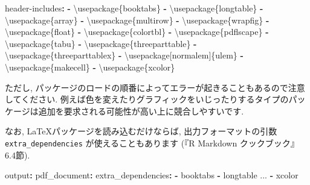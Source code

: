 \documentclass[
]{ltjsarticle}
\newenvironment{Shaded}{\begin{snugshade}}{\end{snugshade}}
\newcommand{\AttributeTok}[1]{\textcolor[rgb]{0.77,0.63,0.00}{#1}}
\newcommand{\FunctionTok}[1]{\textcolor[rgb]{0.00,0.00,0.00}{#1}}
\newcommand{\KeywordTok}[1]{\textcolor[rgb]{0.13,0.29,0.53}{\textbf{#1}}}
\begin{document}
\begin{Shaded}
\begin{Highlighting}[]
\FunctionTok{header{-}includes}\KeywordTok{:}
\AttributeTok{  }\KeywordTok{{-}}\AttributeTok{ \textbackslash{}usepackage\{booktabs\}}
\AttributeTok{  }\KeywordTok{{-}}\AttributeTok{ \textbackslash{}usepackage\{longtable\}}
\AttributeTok{  }\KeywordTok{{-}}\AttributeTok{ \textbackslash{}usepackage\{array\}}
\AttributeTok{  }\KeywordTok{{-}}\AttributeTok{ \textbackslash{}usepackage\{multirow\}}
\AttributeTok{  }\KeywordTok{{-}}\AttributeTok{ \textbackslash{}usepackage\{wrapfig\}}
\AttributeTok{  }\KeywordTok{{-}}\AttributeTok{ \textbackslash{}usepackage\{float\}}
\AttributeTok{  }\KeywordTok{{-}}\AttributeTok{ \textbackslash{}usepackage\{colortbl\}}
\AttributeTok{  }\KeywordTok{{-}}\AttributeTok{ \textbackslash{}usepackage\{pdflscape\}}
\AttributeTok{  }\KeywordTok{{-}}\AttributeTok{ \textbackslash{}usepackage\{tabu\}}
\AttributeTok{  }\KeywordTok{{-}}\AttributeTok{ \textbackslash{}usepackage\{threeparttable\}}
\AttributeTok{  }\KeywordTok{{-}}\AttributeTok{ \textbackslash{}usepackage\{threeparttablex\}}
\AttributeTok{  }\KeywordTok{{-}}\AttributeTok{ \textbackslash{}usepackage[normalem]\{ulem\}}
\AttributeTok{  }\KeywordTok{{-}}\AttributeTok{ \textbackslash{}usepackage\{makecell\}}
\AttributeTok{  }\KeywordTok{{-}}\AttributeTok{ \textbackslash{}usepackage\{xcolor\}}
\end{Highlighting}
\end{Shaded}

ただし, パッケージのロードの順番によってエラーが起きることもあるので注意してください. 例えば色を変えたりグラフィックをいじったりするタイプのパッケージは追加を要求される可能性が高い上に競合しやすいです.

なお, LaTeXパッケージを読み込むだけならば, 出力フォーマットの引数 \texttt{extra\_dependencies} が使えることもあります (『R Markdown クックブック』6.4節).

\begin{Shaded}
\begin{Highlighting}[]
\FunctionTok{output}\KeywordTok{:}
\AttributeTok{  }\FunctionTok{pdf\_document}\KeywordTok{:}
\AttributeTok{    }\FunctionTok{extra\_dependencies}\KeywordTok{:}
\AttributeTok{      }\KeywordTok{{-}}\AttributeTok{ booktabs}
\AttributeTok{      }\KeywordTok{{-}}\AttributeTok{ longtable}
\AttributeTok{      ...}
\AttributeTok{      }\KeywordTok{{-}}\AttributeTok{ xcolor}
\end{Highlighting}
\end{Shaded}
\end{document}
